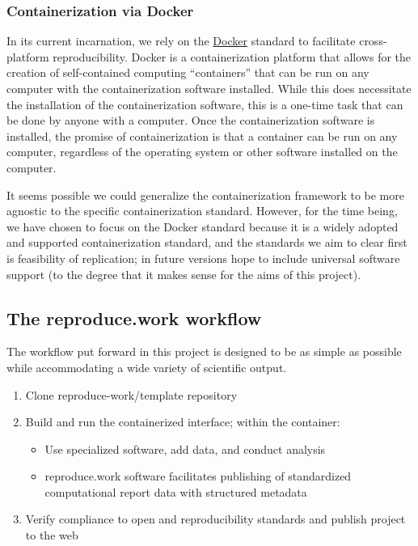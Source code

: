 \hypertarget{containerization-via-docker}{%
\subsubsection{Containerization via Docker}\label{containerization-via-docker}}

In its current incarnation, we rely on the \href{https://www.docker.com/}{Docker} standard to facilitate cross-platform reproducibility. Docker is a containerization platform that allows for the creation of self-contained computing ``containers'' that can be run on any computer with the containerization software installed. While this does necessitate the installation of the containerization software, this is a one-time task that can be done by anyone with a computer. Once the containerization software is installed, the promise of containerization is that a container can be run on any computer, regardless of the operating system or other software installed on the computer.

It seems possible we could generalize the containerization framework to be more agnostic to the specific containerization standard. However, for the time being, we have chosen to focus on the Docker standard because it is a widely adopted and supported containerization standard, and the standards we aim to clear first is feasibility of replication; in future versions hope to include universal software support (to the degree that it makes sense for the aims of this project). 

\hypertarget{the-reproduce.work-workflow}{%
\subsection{The reproduce.work workflow}\label{the-reproduce.work-workflow}}

The workflow put forward in this project is designed to be as simple as possible while accommodating a wide variety of scientific output. 

\begin{enumerate}
\itemsep -0.2em
\item Clone reproduce-work/template repository
\item Build and run the containerized interface; within the container:

\begin{itemize}
\itemsep -0.2em
\item Use specialized software, add data, and conduct analysis
\item reproduce.work software facilitates publishing of standardized computational report data with structured metadata
\end{itemize}
\item Verify compliance to open and reproducibility standards and publish project to the web
\end{enumerate}

